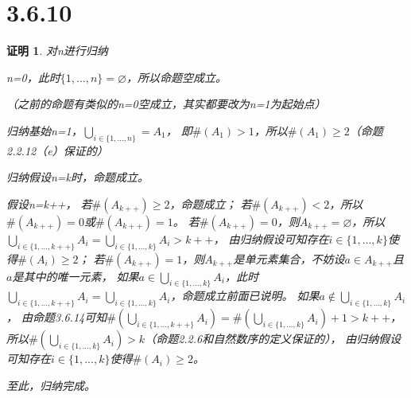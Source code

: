 \documentclass{article}
\theoremstyle{mystyle}
\theoremstyle{zproofstyle}
\newtheorem*{zproof}{证明}
\begin{document}
\section*{3.6.10}
\begin{zproof}
  对n进行归纳

  n=0，此时$\{1,...,n\} = \varnothing$，所以命题空成立。

  （之前的命题有类似的n=0空成立，其实都要改为n=1为起始点）

  归纳基始n=1，$\bigcup\limits_{i \in \{1,...,n\}}=A_1$，
  即$\#(A_1) > 1$，所以$\#(A_1) \geq 2$（命题2.2.12（e）保证的）

  归纳假设n=k时，命题成立。

  假设n=k++，
  若$\#(A_{k++}) \geq 2$，命题成立；
  若$\#(A_{k++}) < 2$，所以$\#(A_{k++})=0 $或$ \#(A_{k++})=1$。
  若$\#(A_{k++})=0$，则$A_{k++} = \varnothing$，所以
  $\bigcup\limits_{i \in \{1,...,k++\}}A_i = \bigcup\limits_{i \in \{1,...,k\}}A_i > k++$，
  由归纳假设可知存在$i \in \{1,...,k\}$使得$\#(A_i) \geq 2$；
  若$\#(A_{k++})=1$，则$A_{k++}$是单元素集合，不妨设$a \in A_{k++}$且$a$是其中的唯一元素，
  如果$a \in \bigcup\limits_{i \in \{1,...,k\}}A_i$，此时
  $\bigcup\limits_{i \in \{1,...,k++\}}A_i = \bigcup\limits_{i \in \{1,...,k\}}A_i$，命题成立前面已说明。
  如果$a \notin \bigcup\limits_{i \in \{1,...,k\}}A_i$，
  由命题3.6.14可知$\#(\bigcup\limits_{i \in \{1,...,k++\}}A_i) = \#(\bigcup\limits_{i \in \{1,...,k\}}A_i) + 1 > k++$，
  所以$\#(\bigcup\limits_{i \in \{1,...,k\}}A_i) > k$（命题2.2.6和自然数序的定义保证的），
  由归纳假设可知存在$i \in \{1,...,k\}$使得$\#(A_i) \geq 2$。

  至此，归纳完成。

\end{zproof}
\end{document}
